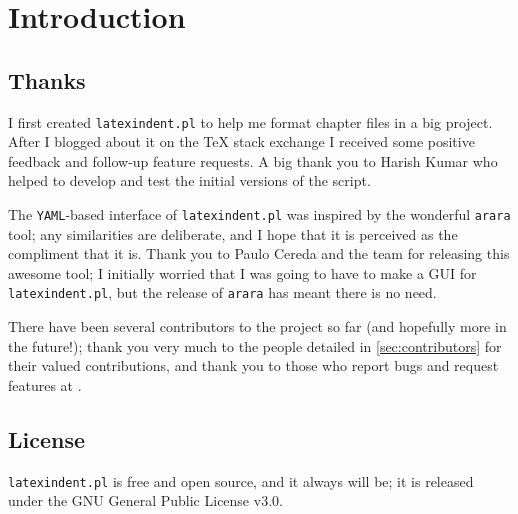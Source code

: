 \section{Introduction}
\subsection{Thanks}
	I first created \texttt{latexindent.pl} to help me format chapter files in a big project.
	After I blogged about it on the \TeX{} stack exchange
	\cite{cmhblog} I received some positive feedback and follow-up feature requests.
	A big thank you to Harish Kumar \cite{harish} who helped to develop and test the
	initial versions of the script.

	The \texttt{YAML}-based interface of \texttt{latexindent.pl} was inspired by the
	wonderful \texttt{arara} tool; any similarities are deliberate, and I hope that
	it is perceived as the compliment that it is. Thank you to Paulo Cereda and the team for
	releasing this awesome tool; I initially worried that I was going to have to make a GUI
	for \texttt{latexindent.pl}, but the release of \texttt{arara} has meant there is
	no need.

	There have been several contributors to the project so far (and hopefully more in the
	future!); thank you very much to the people detailed in \vref{sec:contributors} for their
	valued contributions, and thank you to those who report bugs and request features at
	\cite{latexindent-home}.

\subsection{License}
	\texttt{latexindent.pl} is free and open source, and it always will be; it
	is released under the GNU General Public License v3.0.

